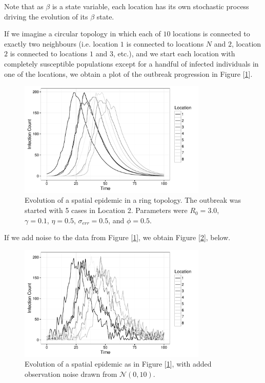 \documentclass[12pt]{article}
\begin{document}
	Note that as $\beta$ is a state variable, each location has its own stochastic process driving the evolution of its $\beta$ state.

	If we imagine a circular topology in which each of $10$ locations is connected to exactly two neighbours (i.e. location $1$ is connected to locations $N$ and $2$, location $2$ is connected to locations $1$ and $3$, etc.), and we start each location with completely susceptible populations except for a handful of infected individuals in one of the locations, we obtain a plot of the outbreak progression in Figure [\ref{dataplot}].

	\begin{figure}[H]
        \centering
        \captionsetup{width=.8\linewidth}
        \includegraphics[width=0.8\textwidth]{./images/dataplot.pdf}
        \caption{Evolution of a spatial epidemic in a ring topology. The outbreak was started with 5 cases in Location 2. Parameters were $R_0 = 3.0$, $\gamma = 0.1$, $\eta = 0.5$, $\sigma_{err} = 0.5$, and $\phi = 0.5$.}
        \label{dataplot}
    \end{figure}

    If we add noise to the data from Figure [\ref{dataplot}], we obtain Figure [\ref{dataplot2}], below.

    \begin{figure}[H]
        \centering
        \captionsetup{width=.8\linewidth}
        \includegraphics[width=0.8\textwidth]{./images/dataplot2.pdf}
        \caption{Evolution of a spatial epidemic as in Figure [\ref{dataplot}], with added observation noise drawn from $\mathcal{N}(0,10)$.}
        \label{dataplot2}
    \end{figure}
\end{document}
